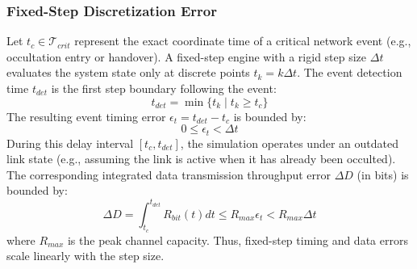 \documentclass[a4paper,fleqn]{cas-sc}
\begin{document}
\subsubsection{Fixed-Step Discretization Error}
Let $t_c \in \mathcal{T}_{crit}$ represent the exact coordinate time of a critical network event (e.g., occultation entry or handover). A fixed-step engine with a rigid step size $\Delta t$ evaluates the system state only at discrete points $t_k = k \Delta t$. The event detection time $t_{det}$ is the first step boundary following the event:
\begin{equation}
    t_{det} = \min \{ t_k \mid t_k \ge t_c \}
\end{equation}
The resulting event timing error $\epsilon_t = t_{det} - t_c$ is bounded by:
\begin{equation}
    0 \le \epsilon_t < \Delta t
\end{equation}
During this delay interval $[t_c, t_{det}]$, the simulation operates under an outdated link state (e.g., assuming the link is active when it has already been occulted). The corresponding integrated data transmission throughput error $\Delta D$ (in bits) is bounded by:
\begin{equation}
    \Delta D = \int_{t_c}^{t_{det}} R_{bit}(t) dt \le R_{max} \epsilon_t < R_{max} \Delta t
\end{equation}
where $R_{max}$ is the peak channel capacity. Thus, fixed-step timing and data errors scale linearly with the step size.
\end{document}
